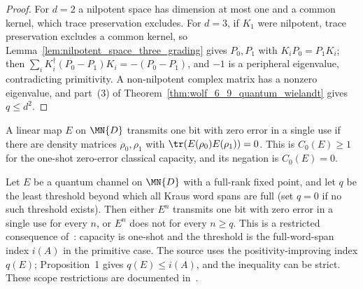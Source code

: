\begin{proof}\leanok
    For $d=2$ a nilpotent space has dimension at most one and a common kernel,
    which trace preservation excludes. For $d=3$, if $K_1$ were nilpotent,
    trace preservation excludes a common kernel, so
    Lemma~\ref{lem:nilpotent_space_three_grading} gives $P_0,P_1$ with
    $K_iP_0=P_1K_i$; then
    $\sum_iK_i^\dagger(P_0-P_1)K_i=-(P_0-P_1)$, and $-1$ is a peripheral
    eigenvalue, contradicting primitivity. A non-nilpotent complex matrix has
    a nonzero eigenvalue, and part~(3) of
    Theorem~\ref{thm:wolf_6_9_quantum_wielandt} gives $q\leq d^2$.
\end{proof}

\begin{definition}
    \label{def:one_shot_zero_error_bit}
    \leanok
    A linear map $E$ on $\MN{D}$ transmits one bit with zero error in a
    single use if there are density matrices $\rho_0,\rho_1$ with
    $\tr(E(\rho_0)E(\rho_1))=0$. This is $C_0(E)\geq1$ for the one-shot
    zero-error classical capacity, and its negation is $C_0(E)=0$.
\end{definition}

\begin{theorem}
    \label{thm:zero_error_dichotomy}
    \leanok
    Let $E$ be a quantum channel on $\MN{D}$ with a full-rank fixed point,
    and let $q$ be the least threshold beyond which all Kraus word spans are full
    (set $q=0$ if no such threshold exists). Then either $E^n$ transmits one
    bit with zero error in a single use for every $n$, or $E^n$ does not for every $n\ge q$.
    This is a restricted consequence of~\cite[Theorem~2]{Sanz2010Quantum}:
    capacity is one-shot and the threshold is the full-word-span index $i(A)$
    in the primitive case. The source uses the positivity-improving index $q(E)$;
    Proposition~1 gives $q(E)\le i(A)$, and the inequality can be strict.
    These scope restrictions are documented in~\cite{gap:spwc10_zero_error_capacity}.
\end{theorem}

